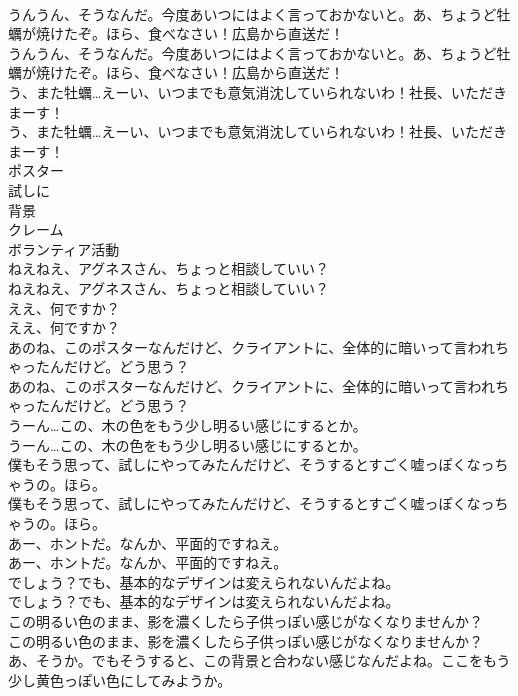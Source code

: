\documentclass[8pt]{extreport}
\begin{document}
\begin{CJK}{UTF8}{min}
\\	うんうん、そうなんだ。今度あいつにはよく言っておかないと。あ、ちょうど牡蠣が焼けたぞ。ほら、食べなさい！広島から直送だ！	
\\	うんうん、そうなんだ。今度あいつにはよく言っておかないと。あ、ちょうど牡蠣が焼けたぞ。ほら、食べなさい！広島から直送だ！ 
\\	う、また牡蠣…えーい、いつまでも意気消沈していられないわ！社長、いただきまーす！	
\\	う、また牡蠣…えーい、いつまでも意気消沈していられないわ！社長、いただきまーす！ 
\\	ポスター
\\	試しに
\\	背景
\\	クレーム
\\	ボランティア活動
\\	ねえねえ、アグネスさん、ちょっと相談していい？	
\\	ねえねえ、アグネスさん、ちょっと相談していい？ 
\\	ええ、何ですか？	
\\	ええ、何ですか？ 
\\	あのね、このポスターなんだけど、クライアントに、全体的に暗いって言われちゃったんだけど。どう思う？	
\\	あのね、このポスターなんだけど、クライアントに、全体的に暗いって言われちゃったんだけど。どう思う？ 
\\	うーん…この、木の色をもう少し明るい感じにするとか。	
\\	うーん…この、木の色をもう少し明るい感じにするとか。 
\\	僕もそう思って、試しにやってみたんだけど、そうするとすごく嘘っぽくなっちゃうの。ほら。	
\\	僕もそう思って、試しにやってみたんだけど、そうするとすごく嘘っぽくなっちゃうの。ほら。 
\\	あー、ホントだ。なんか、平面的ですねえ。	
\\	あー、ホントだ。なんか、平面的ですねえ。 
\\	でしょう？でも、基本的なデザインは変えられないんだよね。	
\\	でしょう？でも、基本的なデザインは変えられないんだよね。 
\\	この明るい色のまま、影を濃くしたら子供っぽい感じがなくなりませんか？	
\\	この明るい色のまま、影を濃くしたら子供っぽい感じがなくなりませんか？ 
\\	あ、そうか。でもそうすると、この背景と合わない感じなんだよね。ここをもう少し黄色っぽい色にしてみようか。	

\end{CJK}
\end{document}
